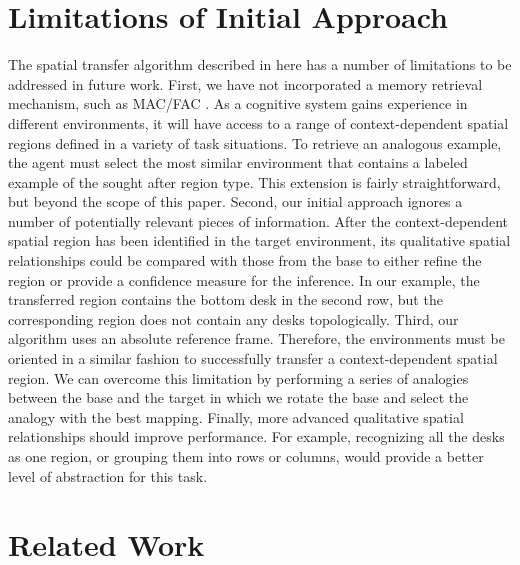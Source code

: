 \documentclass[letterpaper]{article}
\begin{document}
\section{Limitations of Initial Approach}

The spatial transfer algorithm described in here has a number of limitations to be addressed in future work.  First, we have not incorporated a memory retrieval mechanism, such as MAC/FAC \cite{forbus/etal1995}.  As a cognitive system gains experience in different environments, it will have access to a range of context-dependent spatial regions defined in a variety of task situations. To retrieve an analogous example, the agent must select the most similar environment that contains a labeled example of the sought after region type. This extension is fairly straightforward, but beyond the scope of this paper. Second, our initial approach ignores a number of potentially relevant pieces of information. After the context-dependent spatial region has been identified in the target environment, its qualitative spatial relationships could be compared with those from the base to either refine the region or provide a confidence measure for the inference. In our example, the transferred region contains the bottom desk in the second row, but the corresponding region does not contain any desks topologically. Third, our algorithm uses an absolute reference frame. Therefore, the environments must be oriented in a similar fashion to successfully transfer a context-dependent spatial region. We can overcome this limitation by performing a series of analogies between the base and the target in which we rotate the base and select the analogy with the best mapping. Finally, more advanced qualitative spatial relationships should improve performance. For example, recognizing all the desks as one region, or grouping them into rows or columns, would provide a better level of abstraction for this task.

\section{Related Work}
\end{document}
